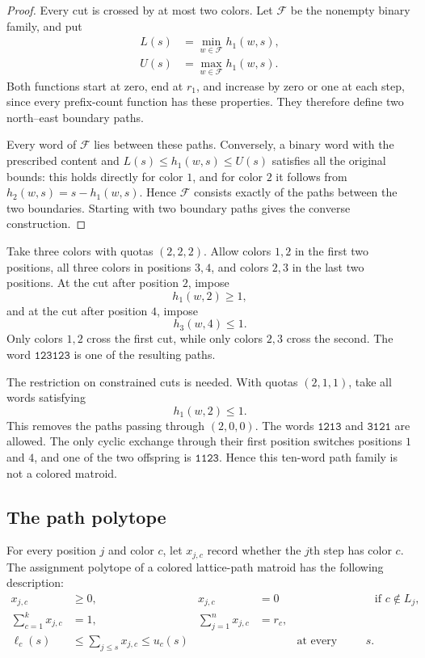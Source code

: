 \begin{proof}
Every cut is crossed by at most two colors. Let $\mathcal F$ be the
nonempty binary family, and put
\[
 \begin{aligned}
 L(s)&=\min_{w\in\mathcal F}h_1(w,s),\\
 U(s)&=\max_{w\in\mathcal F}h_1(w,s).
 \end{aligned}
\]
Both functions start at zero, end at $r_1$, and increase by zero or one
at each step, since every prefix-count function has these properties.
They therefore define two north--east boundary paths.

Every word of $\mathcal F$ lies between these paths. Conversely, a binary
word with the prescribed content and $L(s)\le h_1(w,s)\le U(s)$ satisfies
all the original bounds: this holds directly for color $1$, and for color
$2$ it follows from $h_2(w,s)=s-h_1(w,s)$. Hence $\mathcal F$ consists
exactly of the paths between the two boundaries. Starting with two boundary
paths gives the converse construction.
\end{proof}

\begin{example}
Take three colors with quotas $(2,2,2)$. Allow colors $1,2$ in the first two
positions, all three colors in positions $3,4$, and colors $2,3$ in the last
two positions. At the cut after position $2$, impose
\[
 h_1(w,2)\geq1,
\]
and at the cut after position $4$, impose
\[
 h_3(w,4)\leq1.
\]
Only colors $1,2$ cross the first cut, while only colors $2,3$ cross the
second. The word $\mathtt{123123}$ is one of the resulting paths.
\end{example}

The restriction on constrained cuts is needed. With quotas $(2,1,1)$, take
all words satisfying
\[
 h_1(w,2)\leq1.
\]
This removes the paths passing through $(2,0,0)$. The words
$\mathtt{1213}$ and $\mathtt{3121}$ are allowed. The only cyclic exchange
through their first position switches positions $1$ and $4$, and one of the
two offspring is $\mathtt{1123}$. Hence this ten-word path family is not a
colored matroid.

\subsection[pathPolytope]{The path polytope}

For every position $j$ and color $c$, let $x_{j,c}$ record whether the $j$th
step has color $c$. The assignment polytope of a colored lattice-path matroid
has the following description:
\[
\begin{aligned}
 x_{j,c}&\geq0,
 &x_{j,c}&=0 &&\text{if }c\notin L_j,\\
 \sum_{c=1}^k x_{j,c}&=1,
 &\sum_{j=1}^n x_{j,c}&=r_c,\\
 \ell_c(s)&\leq\sum_{j\leq s}x_{j,c}\leq u_c(s)
 &&&\text{at every constrained cut }s.
\end{aligned}
\]

